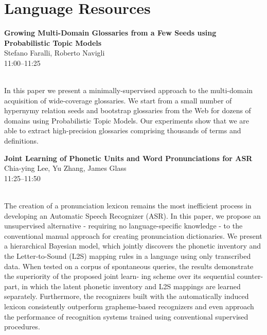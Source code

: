\documentclass[twoside,makeidx]{book}
\begin{document}
\section{Language Resources}
\vspace{-1em}
\par\vspace{2em}\noindent%
\begin{minipage}{\linewidth}%
\begin{center}
\textbf{\normalsize Growing Multi-Domain Glossaries from a Few Seeds using Probabilistic Topic Models}\\
\normalsize  Stefano Faralli,  Roberto Navigli\\
{\small 11:00--11:25}\\
\end{center}
\end{minipage}\\[0.5em]
\nopagebreak%
\noindent%
{\small In this paper we present a minimally-supervised approach to the multi-domain acquisition of wide-coverage glossaries. We start from a small number of hypernymy relation seeds and bootstrap glossaries from the Web for dozens of domains using Probabilistic Topic Models. Our experiments show that we are able to extract high-precision glossaries comprising thousands of terms and definitions.}
\par\vspace{2em}\noindent%
\begin{minipage}{\linewidth}%
\begin{center}
\textbf{\normalsize Joint Learning of Phonetic Units and Word Pronunciations for ASR}\\
\normalsize  Chia-ying Lee,  Yu Zhang,  James Glass\\
{\small 11:25--11:50}\\
\end{center}
\end{minipage}\\[0.5em]
\nopagebreak%
\noindent%
{\small The creation of a pronunciation lexicon remains the most inefficient process in developing an Automatic Speech Recognizer (ASR). In this paper, we propose an unsupervised alternative - requiring no language-specific knowledge - to the conventional manual approach for creating pronunciation dictionaries. We present a hierarchical Bayesian model, which jointly discovers the phonetic inventory and the Letter-to-Sound (L2S) mapping rules in a language using only transcribed data. When tested on a corpus of spontaneous queries, the results demonstrate the superiority of the proposed joint learn- ing scheme over its sequential counter- part, in which the latent phonetic inventory and L2S mappings are learned separately. Furthermore, the recognizers built with the automatically induced lexicon consistently outperform grapheme-based recognizers and even approach the performance of recognition systems trained using conventional supervised procedures.}
\end{document}

